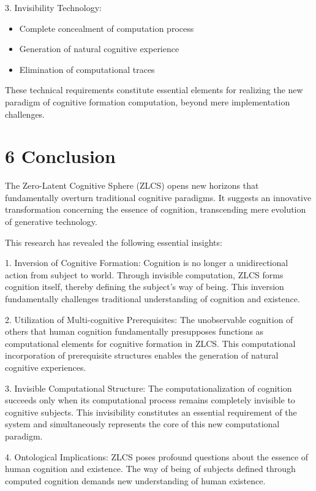 \documentclass{article}
\begin{document}
3. Invisibility Technology:
   \begin{itemize}
       \item Complete concealment of computation process
       \item Generation of natural cognitive experience
       \item Elimination of computational traces
   \end{itemize}

These technical requirements constitute essential elements for realizing the new paradigm of cognitive formation computation, beyond mere implementation challenges.

\section{6 Conclusion}

The Zero-Latent Cognitive Sphere (ZLCS) opens new horizons that fundamentally overturn traditional cognitive paradigms. It suggests an innovative transformation concerning the essence of cognition, transcending mere evolution of generative technology.

This research has revealed the following essential insights:

1. Inversion of Cognitive Formation: Cognition is no longer a unidirectional action from subject to world. Through invisible computation, ZLCS forms cognition itself, thereby defining the subject's way of being. This inversion fundamentally challenges traditional understanding of cognition and existence.

2. Utilization of Multi-cognitive Prerequisites: The unobservable cognition of others that human cognition fundamentally presupposes functions as computational elements for cognitive formation in ZLCS. This computational incorporation of prerequisite structures enables the generation of natural cognitive experiences.

3. Invisible Computational Structure: The computationalization of cognition succeeds only when its computational process remains completely invisible to cognitive subjects. This invisibility constitutes an essential requirement of the system and simultaneously represents the core of this new computational paradigm.

4. Ontological Implications: ZLCS poses profound questions about the essence of human cognition and existence. The way of being of subjects defined through computed cognition demands new understanding of human existence.
\end{document}
